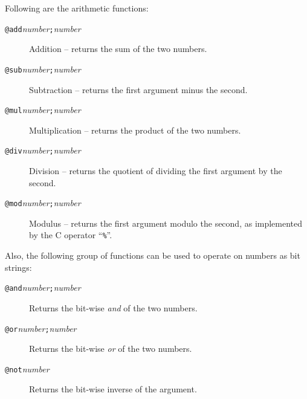 Following are the arithmetic functions:
\begin{description}
\item[{\tt @add\ttlb}{\it number}{\tt ;}{\it number}{\tt \ttrb}]
Addition -- returns the sum of the two numbers.
\item[{\tt @sub\ttlb}{\it number}{\tt ;}{\it number}{\tt \ttrb}]
Subtraction -- returns the first argument minus the second.
\item[{\tt @mul\ttlb}{\it number}{\tt ;}{\it number}{\tt \ttrb}]
Multiplication -- returns the product of the two numbers.
\item[{\tt @div\ttlb}{\it number}{\tt ;}{\it number}{\tt \ttrb}]
Division -- returns the quotient of dividing the first argument by the second.
\item[{\tt @mod\ttlb}{\it number}{\tt ;}{\it number}{\tt \ttrb}]
Modulus -- returns the first argument modulo the second, as implemented by
the C operator ``\verb/%/''.
\end{description}

Also, the following group of functions can be used to operate on numbers
as bit strings:
\begin{description}
\item[{\tt @and\ttlb}{\it number}{\tt ;}{\it number}{\tt \ttrb}]
Returns the bit-wise {\it and} of the two numbers.
\item[{\tt @or\ttlb}{\it number}{\tt ;}{\it number}{\tt \ttrb}]
Returns the bit-wise {\it or} of the two numbers.
\item[{\tt @not\ttlb}{\it number}{\tt \ttrb}]
Returns the bit-wise inverse of the argument.
\end{description}

